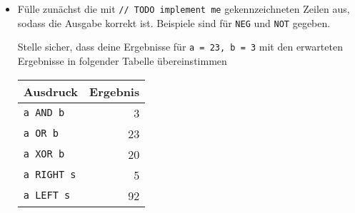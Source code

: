 \begin{itemize}
\item 
Fülle zunächst die mit \lstinline|// TODO implement me| gekennzeichneten Zeilen aus, sodass die Ausgabe korrekt ist.
Beispiele sind für \texttt{NEG} und \texttt{NOT} gegeben.

Stelle sicher, dass deine Ergebnisse für \lstinline|a = 23, b = 3| mit den erwarteten Ergebnisse in folgender Tabelle übereinstimmen\\
\begin{tabular}{lr}
\toprule
\textbf{Ausdruck} & \textbf{Ergebnis}\\
\midrule
\texttt{a AND b} & 3\\
\texttt{a OR b} & 23\\
\texttt{a XOR b} & 20\\
\midrule
\texttt{a RIGHT s} & 5\\
\texttt{a LEFT s} & 92\\
\bottomrule
\end{tabular}


\end{itemize}
